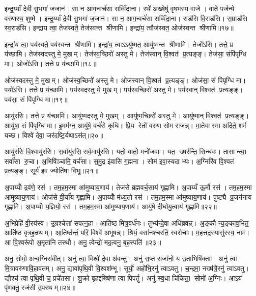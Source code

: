 इन्द्र॒य्याँ दे॒वी सु॒भगा॑ ज॒जान॑। सा न॒ आग॒न्वर्च॑सा सव्विँदा॒ना। रथे॑ अ॒ख्षेषु॑ वृष॒भस्य॒ वाजे। वाते॑ प॒र्जन्ये॒ वरु॑णस्य॒ शुष्मे। इन्द्र॒य्याँ दे॒वी सु॒भगा॑ ज॒जान॑। सा न॒ आग॒न्वर्च॑सा सव्विँदा॒ना। राड॑सि वि॒राड॑सि। स॒म्राड॑सि स्व॒राड॑सि। इन्द्रा॑य त्वा॒ तेज॑स्वते॒ तेज॑स्वन्त श्रीणामि। इन्द्रा॑य॒ त्वौज॑स्वत॒ ओज॑स्वन्त श्रीणामि॥१७॥

इन्द्रा॑य त्वा॒ पय॑स्वते॒ पय॑स्वन्त श्रीणामि। इन्द्रा॑य॒ त्वाऽऽयु॑ष्मत॒ आयु॑ष्मन्त श्रीणामि। तेजो॑ऽसि। तत्ते॒ प्र य॑च्छामि। तेज॑स्वदस्तु मे॒ मुखम्। तेज॑स्व॒च्छिरो॑ अस्तु मे। तेज॑स्वान् वि॒श्वत॑ प्र॒त्यङ्ङ्। तेज॑सा॒ संपि॑पृग्धि मा। ओजो॑ऽसि। तत्ते॒ प्र य॑च्छामि॥१८॥

ओज॑स्वदस्तु मे॒ मुखम्। ओज॑स्व॒च्छिरो॑ अस्तु मे। ओज॑स्वान् वि॒श्वत॑ प्र॒त्यङ्ङ्। ओज॑सा॒ सं पि॑पृग्धि मा। पयो॑ऽसि। तत्ते॒ प्र य॑च्छामि। पय॑स्वदस्तु मे॒ मुखम्। पय॑स्व॒च्छिरो॑ अस्तु मे। पय॑स्वान् वि॒श्वत॑ प्र॒त्यङ्ङ्। पय॑सा॒ सं पि॑पृग्धि मा॥१९॥

आयु॑रसि। तत्ते॒ प्र य॑च्छामि। आयु॑ष्मदस्तु मे॒ मुखम्। आयु॑ष्म॒च्छिरो॑ अस्तु मे। आयु॑ष्मान् वि॒श्वत॑ प्र॒त्यङ्ङ्। आयु॑षा॒ सं पि॑पृग्धि मा। इ॒मम॑ग्न॒ आयु॑षे॒ वर्च॑से कृधि। प्रि॒य रेतो॑ वरुण सोम राजन्न्। मा॒तेवास्मा अदिते॒ शर्म॑ यच्छ। विश्वे॑ देवा॒ जर॑दष्टि॒र्यथाऽस॑त्॥२०॥

आयु॑रसि वि॒श्वायु॑रसि। स॒र्वायु॑रसि॒ सर्व॒मायु॑रसि। यतो॒ वातो॒ मनो॑जवाः। यत॒ ख्षर॑न्ति॒ सिन्ध॑वः। तासान्त्वा॒ सर्वा॑सा रु॒चा। अ॒भिषि॑ञ्चामि॒ वर्च॑सा। स॒मु॒द्र इ॑वासि ग॒ह्मना। सोम॑ इवा॒स्यदाभ्यः। अ॒ग्निरि॑व वि॒श्वत॑ प्र॒त्यङ्ङ्। सूर्य॑ इव॒ ज्योति॑षा वि॒भूः॥२१॥

अ॒पाय्योँ द्रव॑णे॒ रस॑। तम॒हम॒स्मा आ॑मुष्याय॒णाय॑। तेज॑से ब्रह्मवर्च॒साय॑ गृह्णामि। अ॒पाय्यँ ऊ॒र्मौ रस॑। तम॒हम॒स्मा आ॑मुष्याय॒णाय॑। ओज॑से वी॒र्या॑य गृह्णामि। अ॒पाय्योँ म॑ध्य॒तो रस॑। तम॒हम॒स्मा आ॑मुष्याय॒णाय॑। पुष्ट्यै प्र॒जन॑नाय गृह्णामि। अ॒पाय्योँ य॒ज्ञियो॒ रस॑। तम॒हम॒स्मा आ॑मुष्याय॒णाय॑। आयु॑षे दीर्घायु॒त्वाय॑ गृह्णामि॥२२॥\anuvakamend[गोष्वोज॑स्वन्त श्रीणा॒म्योजो॑ऽसि॒ तत्ते॒ प्रय॑च्छामि॒ पय॑सा॒ संपि॑पृग्धि॒ माऽस॑द्वि॒भूर्य॒ज्ञियो॒ रसो॒ द्वे च॑]

अ॒भिप्रेहि॑ वी॒रय॑स्व। उ॒ग्रश्चेत्ता॑ सपत्न॒हा। आति॑ष्ठ मित्र॒वर्ध॑नः। तुभ्य॑न्दे॒वा अधि॑ब्रवन्न्। अ॒ङ्कौ न्य॒ङ्काव॒भित॒ आति॑ष्ठ वृत्रह॒न्रथम्। आ॒तिष्ठ॑न्तं॒ परि॒ विश्वे॑ अभूषन्न्। श्रियं॒ वसा॑नश्चरति॒ स्वरो॑चाः। म॒हत्तद॒स्यासु॑रस्य॒ नाम॑। आ वि॒श्वरू॑पो अ॒मृता॑नि तस्थौ। अनु॒ त्वेन्द्रो॑ मद॒त्वनु॒ बृह॒स्पति॑॥२३॥

अनु॒ सोमो॒ अन्व॒ग्निरा॑वीत्। अनु॑ त्वा॒ विश्वे॑ दे॒वा अ॑वन्तु। अनु॑ स॒प्त राजा॑नो॒ य उ॒ताभिषि॑क्ताः। अनु॑ त्वा मि॒त्रावरु॑णावि॒हाव॑तम्। अनु॒ द्यावा॑पृथि॒वी वि॒श्वश॑म्भू। सूर्यो॒ अहो॑भि॒रनु॑ त्वाऽवतु। च॒न्द्रमा॒ नख्ष॑त्रै॒रनु॑ त्वाऽवतु। द्यौश्च॑ त्वा पृथि॒वी च॒ प्रचे॑तसा। शु॒क्रो बृ॒हद्दख्षि॑णा त्वा पिपर्तु। अनु॑ स्व॒धा चि॑किता॒ सोमो॑ अ॒ग्निः। आऽयं पृ॑णक्तु॒ रज॑सी उ॒पस्थम्॥२४॥\anuvakamend[बृह॒स्पति॒स्सोमो॑ अ॒ग्निरेक॑ञ्च]

